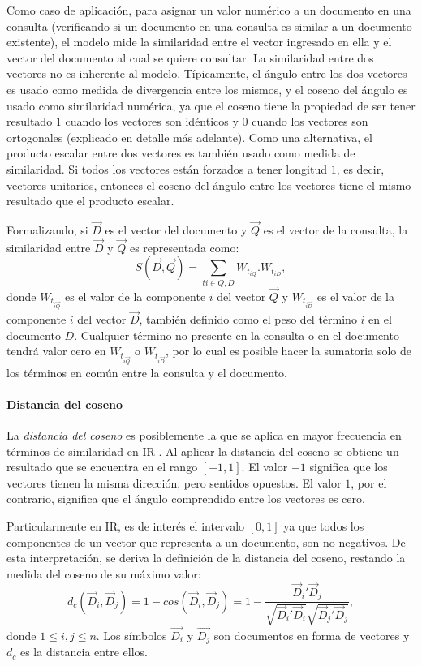 \bigskip Como caso de aplicación, para asignar un valor numérico a un documento en una consulta (verificando si un documento en una consulta es similar a un documento existente), el modelo mide la similaridad entre el vector ingresado en ella y el vector del documento al cual se quiere consultar. La similaridad entre dos vectores no es inherente al modelo. Típicamente, el ángulo entre los dos vectores es usado como medida de divergencia entre los mismos, y el coseno del ángulo es usado como similaridad numérica, ya que el coseno tiene la propiedad de ser tener resultado \(1\) cuando los vectores son idénticos y \(0\) cuando los vectores son ortogonales (explicado en detalle más adelante). Como una alternativa, el producto escalar entre dos vectores es también usado como medida de similaridad. Si todos los vectores están forzados a tener longitud \(1\), es decir, vectores unitarios, entonces el coseno del ángulo entre los vectores tiene el mismo resultado que el producto escalar.

\bigskip Formalizando, si \(\overrightarrow{D}\) es el vector del documento y \(\overrightarrow{Q}\) es el vector de la consulta, la similaridad entre \(\overrightarrow{D}\) y \(\overrightarrow{Q}\) es representada como:
\[S(\vec{D},\vec{Q})=\sum_{ti \in Q,D}^{ }{W_{t_{iQ}}.W_{t_{iD}}},\]
donde \(W_{t_{i \overrightarrow{Q}}}\) es el valor de la componente \(i\) del vector \(\overrightarrow{Q}\) y \(W_{t_{i \overrightarrow{D}}}\) es el valor de la componente \(i\) del vector \(\overrightarrow{D}\), también definido como el peso del término \(i\) en el documento \(D\). Cualquier término no presente en la consulta o en el documento tendrá valor cero en \(W_{t_{i \overrightarrow{Q}}}\) o \(W_{t_{i \overrightarrow{D}}}\), por lo cual es posible hacer la sumatoria solo de los términos en común entre la consulta y el documento.

\paragraph{Distancia del coseno}
La \textit{distancia del coseno} es posiblemente la que se aplica en mayor frecuencia en términos de similaridad en IR \citep{korenius2007principal}. Al aplicar la distancia del coseno se obtiene un resultado que se encuentra en el rango \([-1, 1]\). El valor \(-1\) significa que los vectores tienen la misma dirección, pero sentidos opuestos. El valor \(1\), por el contrario, significa que el ángulo comprendido entre los vectores es cero.

\bigskip Particularmente en IR, es de interés el intervalo \([0, 1]\) ya que todos los componentes de un vector que representa a un documento, son no negativos. De esta interpretación, se deriva la definición de la distancia del coseno, restando la medida del coseno de su máximo valor:
\[d_c(\vec{D}_i, \vec{D}_j) = 1 - cos(\vec{D}_i, \vec{D}_j) = 1 - \frac{{\vec{D}_i}'\vec{D}_j}{\sqrt{{\vec{D}_i}'\vec{D}_i}\sqrt{{\vec{D}_j}'\vec{D}_j}},\]
donde \(1 \leq i,j \leq n\). Los símbolos \(\overrightarrow{D_i}\) y \(\overrightarrow{D_j}\) son documentos en forma de vectores y \(d_c\) es la distancia entre ellos.

